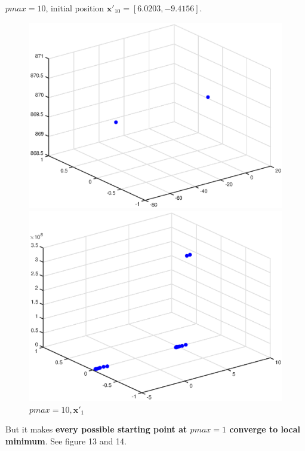 \documentclass{article}
\begin{document}
$pmax=10$, initial position $\mathbf{x}'_{10} = [6.0203,-9.4156]$.
\begin{figure}[h]
\begin{minipage}[t]{0.5\linewidth}
\centering
\includegraphics[scale=0.4]{28}
\caption{$pmax=100,\mathbf{x}'$}
\end{minipage}%
\begin{minipage}[t]{0.5\linewidth}
\centering
\includegraphics[scale=0.4]{29}
\caption{$pmax=10,\mathbf{x}'_{1}$}
\end{minipage}
\end{figure}

\noindent
But it makes \textbf{every possible starting point at $pmax = 1$ converge to local minimum}. See figure 13 and 14.
\end{document}
